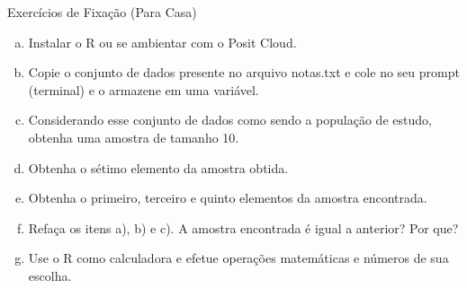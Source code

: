\documentclass{beamer}
\begin{document}
\begin{frame}{Exercícios de Fixação (Para Casa)}
  \begin{enumerate}[a)]
    \item Instalar o R ou se ambientar com o Posit Cloud. 
    \item Copie o conjunto de dados presente no arquivo notas.txt e cole no seu prompt (terminal) e o armazene em uma variável.
    \item Considerando esse conjunto de dados como sendo a população de estudo, obtenha uma amostra de tamanho 10. 
    \item Obtenha o sétimo elemento da amostra obtida. 
    \item Obtenha o primeiro, terceiro e quinto elementos da amostra encontrada. 
    \item Refaça os itens a), b) e c). A amostra encontrada é igual a anterior? Por que?
    \item Use o R como calculadora e efetue operações matemáticas e números de sua escolha.
  \end{enumerate}
\end{frame}
\end{document}
